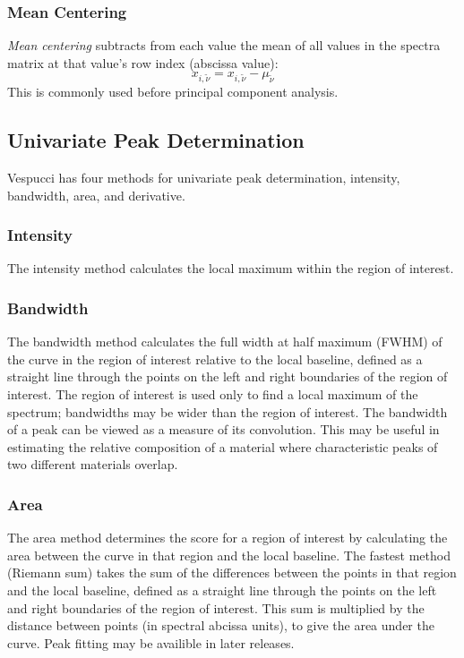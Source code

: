 \documentclass[12pt]{achemso} %
\begin{document}
\subsubsection{Mean Centering}
\emph{Mean centering} subtracts from each value the mean of all values in the spectra 
matrix at that value's row index (abscissa value):
\[x_{i, \tilde{\nu}} = x_{i, \tilde{\nu}} - \mu_{\tilde{\nu}} \]
This is commonly used before principal component analysis.

\subsection{Univariate Peak Determination} Vespucci has four methods for
univariate peak determination, intensity, bandwidth, area, and derivative.

\subsubsection{Intensity} The intensity method calculates the local maximum
within the region of interest.

\subsubsection{Bandwidth} The bandwidth method calculates the full width at half
maximum (FWHM) of the curve in the region of interest relative to the local
baseline, defined as a straight line through the points on the left and right
boundaries of the region of interest. The region of interest is used only to
find a local maximum of the spectrum; bandwidths may be wider than the region of
interest. The bandwidth of a peak can be viewed as a measure of its convolution.
This may be useful in estimating the relative composition of a material where
characteristic peaks of two different materials overlap.

\subsubsection{Area} The area method determines the score for a region of
interest by calculating the area between the curve in that region and the local
baseline. The fastest method (Riemann sum) takes the sum of the differences
between the points in that region and the local baseline, defined as a straight
line through the points on the left and right boundaries of the region of
interest. This sum is multiplied by the distance between points (in spectral
abcissa units), to give the area under the curve. Peak fitting may be availible
in later releases.
\end{document}
